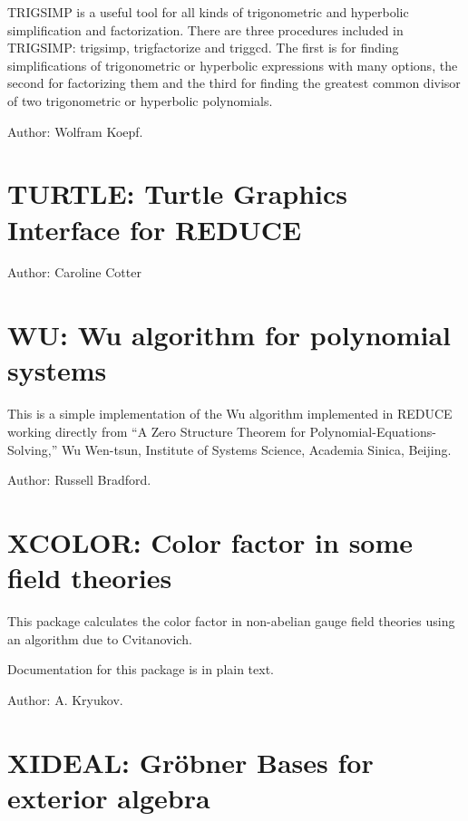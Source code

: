 TRIGSIMP is a useful tool for all kinds of trigonometric and hyperbolic
simplification and factorization.  There are three procedures included in
TRIGSIMP: trigsimp, trigfactorize and triggcd.  The first is for finding
simplifications of trigonometric or hyperbolic expressions with many
options, the second for factorizing them and the third for finding the
greatest common divisor of two trigonometric or hyperbolic polynomials.

Author: Wolfram Koepf.


\newpage

\section{TURTLE: Turtle Graphics Interface for REDUCE}

Author: Caroline Cotter



\newpage

\section{WU: Wu algorithm for polynomial systems} 

This is a simple implementation of the Wu algorithm implemented in REDUCE
working directly from ``A Zero Structure Theorem for
Polynomial-Equations-Solving,'' Wu Wen-tsun, Institute of Systems Science,
Academia Sinica, Beijing.

Author: Russell Bradford.


\newpage

\section{XCOLOR: Color factor in some field theories}

This package calculates the color factor in non-abelian gauge field
theories using an algorithm due to Cvitanovich.

Documentation for this package is in plain text.

Author: A. Kryukov.


\newpage

\section{XIDEAL: Gr\"obner Bases for exterior algebra} 

